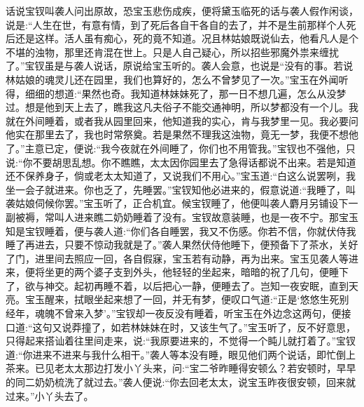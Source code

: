 


\begin{parag}
    话说宝钗叫袭人问出原故，恐宝玉悲伤成疾，便将黛玉临死的话与袭人假作闲谈，说是:“人生在世，有意有情，到了死后各自干各自的去了，并不是生前那样个人死后还是这样。活人虽有痴心，死的竟不知道。况且林姑娘既说仙去，他看凡人是个不堪的浊物，那里还肯混在世上。只是人自己疑心，所以招些邪魔外祟来缠扰了。”宝钗虽是与袭人说话，原说给宝玉听的。袭人会意，也说是“没有的事。若说林姑娘的魂灵儿还在园里，我们也算好的，怎么不曾梦见了一次。”宝玉在外闻听得，细细的想道:“果然也奇。我知道林妹妹死了，那一日不想几遍，怎么从没梦过。想是他到天上去了，瞧我这凡夫俗子不能交通神明，所以梦都没有一个儿。我就在外间睡着，或者我从园里回来，他知道我的实心，肯与我梦里一见。我必要问他实在那里去了，我也时常祭奠。若是果然不理我这浊物，竟无一梦，我便不想他了。”主意已定，便说:“我今夜就在外间睡了，你们也不用管我。”宝钗也不强他，只说:“你不要胡思乱想。你不瞧瞧，太太因你园里去了急得话都说不出来。若是知道还不保养身子，倘或老太太知道了，又说我们不用心。”宝玉道:“白这么说罢咧，我坐一会子就进来。你也乏了，先睡罢。”宝钗知他必进来的，假意说道:“我睡了，叫袭姑娘伺候你罢。”宝玉听了，正合机宜。候宝钗睡了，他便叫袭人麝月另铺设下一副被褥，常叫人进来瞧二奶奶睡着了没有。宝钗故意装睡，也是一夜不宁。那宝玉知是宝钗睡着，便与袭人道:“你们各自睡罢，我又不伤感。你若不信，你就伏侍我睡了再进去，只要不惊动我就是了。”袭人果然伏侍他睡下，便预备下了茶水，关好了门，进里间去照应一回，各自假寐，宝玉若有动静，再为出来。宝玉见袭人等进来，便将坐更的两个婆子支到外头，他轻轻的坐起来，暗暗的祝了几句，便睡下了，欲与神交。起初再睡不着，以后把心一静，便睡去了。岂知一夜安眠，直到天亮。宝玉醒来，拭眼坐起来想了一回，并无有梦，便叹口气道:“正是‘悠悠生死别经年，魂魄不曾来入梦’。”宝钗却一夜反没有睡着，听宝玉在外边念这两句，便接口道:“这句又说莽撞了，如若林妹妹在时，又该生气了。”宝玉听了，反不好意思，只得起来搭讪着往里间走来，说:“我原要进来的，不觉得一个盹儿就打着了。”宝钗道:“你进来不进来与我什么相干。”袭人等本没有睡，眼见他们两个说话，即忙倒上茶来。已见老太太那边打发小丫头来，问:“宝二爷昨睡得安顿么？若安顿时，早早的同二奶奶梳洗了就过去。”袭人便说:“你去回老太太，说宝玉昨夜很安顿，回来就过来。”小丫头去了。
\end{parag}


